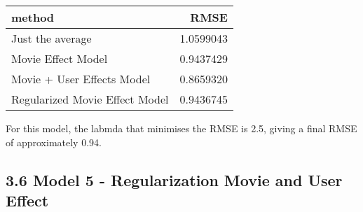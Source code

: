\documentclass[]{article}
\newenvironment{Shaded}{\begin{snugshade}}{\end{snugshade}}
\newcommand{\DataTypeTok}[1]{\textcolor[rgb]{0.13,0.29,0.53}{#1}}
\newcommand{\KeywordTok}[1]{\textcolor[rgb]{0.13,0.29,0.53}{\textbf{#1}}}
\newcommand{\NormalTok}[1]{#1}
\newcommand{\OperatorTok}[1]{\textcolor[rgb]{0.81,0.36,0.00}{\textbf{#1}}}
\newcommand{\StringTok}[1]{\textcolor[rgb]{0.31,0.60,0.02}{#1}}
\begin{document}
\begin{Shaded}
\end{Shaded}

\begin{longtable}[]{@{}lr@{}}
\toprule
method & RMSE\tabularnewline
\midrule
\endhead
Just the average & 1.0599043\tabularnewline
Movie Effect Model & 0.9437429\tabularnewline
Movie + User Effects Model & 0.8659320\tabularnewline
Regularized Movie Effect Model & 0.9436745\tabularnewline
\bottomrule
\end{longtable}

For this model, the labmda that minimises the RMSE is 2.5, giving a
final RMSE of approximately 0.94.

\hypertarget{model-5---regularization-movie-and-user-effect-1}{%
\subsection{3.6 Model 5 - Regularization Movie and User
Effect}\label{model-5---regularization-movie-and-user-effect-1}}
\end{document}
